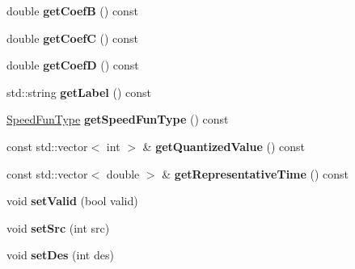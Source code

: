 \begin{DoxyCompactItemize}
\item 
\hypertarget{class_p_a_s_o_edge_data_a1915325b467b357a22ae90e2a164bf2a}{}double {\bfseries get\+Coef\+B} () const \label{class_p_a_s_o_edge_data_a1915325b467b357a22ae90e2a164bf2a}

\item 
\hypertarget{class_p_a_s_o_edge_data_ae28635e06a62769149e755c595a71285}{}double {\bfseries get\+Coef\+C} () const \label{class_p_a_s_o_edge_data_ae28635e06a62769149e755c595a71285}

\item 
\hypertarget{class_p_a_s_o_edge_data_a062f5f00b57b718a6ff4016ed6191a14}{}double {\bfseries get\+Coef\+D} () const \label{class_p_a_s_o_edge_data_a062f5f00b57b718a6ff4016ed6191a14}

\item 
\hypertarget{class_p_a_s_o_edge_data_a0a03fbf06759a19e9267fe5914a6b4fe}{}std\+::string {\bfseries get\+Label} () const \label{class_p_a_s_o_edge_data_a0a03fbf06759a19e9267fe5914a6b4fe}

\item 
\hypertarget{class_p_a_s_o_edge_data_ab8c976edb0887b2d4cadd99ea32d6e84}{}\hyperlink{class_p_a_s_o_edge_data_a30164e651874b10a410d96616c7b4077}{Speed\+Fun\+Type} {\bfseries get\+Speed\+Fun\+Type} () const \label{class_p_a_s_o_edge_data_ab8c976edb0887b2d4cadd99ea32d6e84}

\item 
\hypertarget{class_p_a_s_o_edge_data_a8facf8b73ea6dc0b3169f8908eac6ee2}{}const std\+::vector$<$ int $>$ \& {\bfseries get\+Quantized\+Value} () const \label{class_p_a_s_o_edge_data_a8facf8b73ea6dc0b3169f8908eac6ee2}

\item 
\hypertarget{class_p_a_s_o_edge_data_aa681f8bee135f0b7491f33384d7fdd33}{}const std\+::vector$<$ double $>$ \& {\bfseries get\+Representative\+Time} () const \label{class_p_a_s_o_edge_data_aa681f8bee135f0b7491f33384d7fdd33}

\item 
\hypertarget{class_p_a_s_o_edge_data_ae59154b5e79b06880be42d4debf4013c}{}void {\bfseries set\+Valid} (bool valid)\label{class_p_a_s_o_edge_data_ae59154b5e79b06880be42d4debf4013c}

\item 
\hypertarget{class_p_a_s_o_edge_data_a3e8efe1a7721e4411583230848a5f4c4}{}void {\bfseries set\+Src} (int src)\label{class_p_a_s_o_edge_data_a3e8efe1a7721e4411583230848a5f4c4}

\item 
\hypertarget{class_p_a_s_o_edge_data_af2464c8e26c3df9576bfd760246b01af}{}void {\bfseries set\+Des} (int des)\label{class_p_a_s_o_edge_data_af2464c8e26c3df9576bfd760246b01af}


\end{DoxyCompactItemize}
